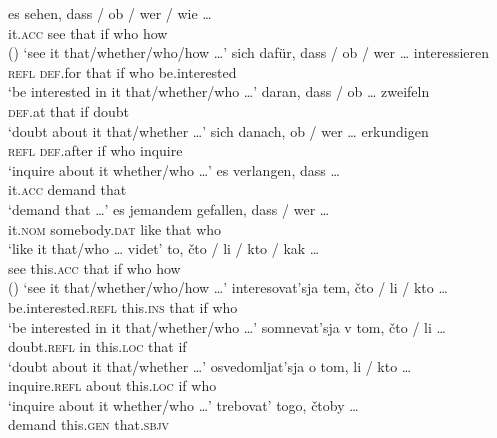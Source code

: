 \documentclass[output=paper]{langscibook}
\begin{document}
\ea\label{ex:zimmermann:3.1}
    \ea \gll es sehen, dass / ob / wer / wie {\dots} \\
    it.\textsc{acc} see that {} if {} who {} how \\ \hfill ()
    \glt `see it that/whether/who/how {\dots}'
    \ex \gll sich dafür, dass / ob / wer {\dots} interessieren \\
    \textsc{refl} \textsc{def}.for that {} if {} who {} be.interested \\
    \glt `be interested in it that/whether/who {\dots}'
    \ex \gll daran, dass / ob {\dots} zweifeln \\
    \textsc{def}.at that {} if {} doubt \\
    \glt `doubt about it that/whether {\dots}'
    \ex \gll sich danach, ob / wer {\dots} erkundigen \\
    \textsc{refl} \textsc{def}.after if {} who {} inquire \\
    \glt `inquire about it whether/who {\dots}'
    \ex \gll es verlangen, dass {\dots} \\
    it.\textsc{acc} demand that {} \\
    \glt `demand that {\dots}'
    \ex \gll es jemandem gefallen, dass / wer {\dots} \\
    it.\textsc{nom} somebody.\textsc{dat} like that {} who {} \\
    \glt `like it that/who {\dots}
\z\ex\label{ex:zimmermann:3.2}
    \ea \gll videt' to, čto / li / kto / kak {\dots} \\
    see this.\textsc{acc} that {} if {} who {} how {} \\ \hfill ()
    \glt `see it that/whether/who/how {\dots}'
    \ex \gll interesovat'sja tem, čto / li / kto {\dots} \\
    be.interested.\textsc{refl} this.\textsc{ins} that {} if {} who {} \\
    \glt `be interested in it that/whether/who {\dots}'
    \ex \gll somnevat'sja v tom, čto / li {\dots} \\
    doubt.\textsc{refl} in this.\textsc{loc} that {} if {} \\
    \glt `doubt about it that/whether {\dots}'
    \ex \gll osvedomljat'sja o tom, li / kto {\dots} \\
    inquire.\textsc{refl} about this.\textsc{loc} if {} who {} \\
    \glt `inquire about it whether/who {\dots}'
    \ex \gll trebovat' togo, čtoby {\dots} \\
    demand this.\textsc{gen} that.\textsc{sbjv} {} \\
\end{document}
